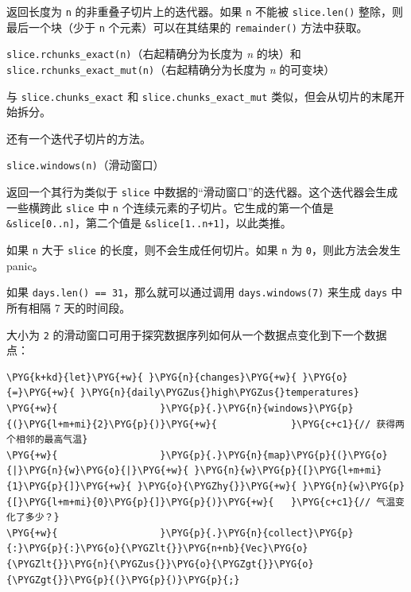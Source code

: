 返回长度为 \texttt{n} 的非重叠子切片上的迭代器。如果 \texttt{n} 不能被 \texttt{slice.len()} 整除，则最后一个块（少于 \texttt{n} 个元素）可以在其结果的 \texttt{remainder()} 方法中获取。

\begin{myNote}
\texttt{slice.rchunks\_exact(n)}（右起精确分为长度为 \emph{n} 的块）和 \texttt{slice.rchunks\_exact\_mut(n)}（右起精确分为长度为 \emph{n} 的可变块）
\end{myNote}

与 \texttt{slice.chunks\_exact} 和 \texttt{slice.chunks\_exact\_mut} 类似，但会从切片的末尾开始拆分。

还有一个迭代子切片的方法。

\begin{mySidenote}
\texttt{slice.windows(n)}（滑动窗口）
\end{mySidenote}

返回一个其行为类似于 \texttt{slice} 中数据的“滑动窗口”的迭代器。这个迭代器会生成一些横跨此 \texttt{slice} 中 \texttt{n} 个连续元素的子切片。它生成的第一个值是 \texttt{\&slice[0..n]}，第二个值是 \texttt{\&slice[1..n+1]}，以此类推。

如果 \texttt{n} 大于 \texttt{slice} 的长度，则不会生成任何切片。如果 \texttt{n} 为 \texttt{0}，则此方法会发生 panic。

如果 \texttt{days.len() == 31}，那么就可以通过调用 \texttt{days.windows(7)} 来生成 \texttt{days} 中所有相隔 7 天的时间段。

大小为 \texttt{2} 的滑动窗口可用于探究数据序列如何从一个数据点变化到下一个数据点：

\begin{Verbatim}[commandchars=\\\{\},breaklines=true,breakanywhere=true,fontsize=\codefont,xleftmargin=17bp]
\PYG{k+kd}{let}\PYG{+w}{ }\PYG{n}{changes}\PYG{+w}{ }\PYG{o}{=}\PYG{+w}{ }\PYG{n}{daily\PYGZus{}high\PYGZus{}temperatures}
\PYG{+w}{                  }\PYG{p}{.}\PYG{n}{windows}\PYG{p}{(}\PYG{l+m+mi}{2}\PYG{p}{)}\PYG{+w}{             }\PYG{c+c1}{// 获得两个相邻的最高气温}
\PYG{+w}{                  }\PYG{p}{.}\PYG{n}{map}\PYG{p}{(}\PYG{o}{|}\PYG{n}{w}\PYG{o}{|}\PYG{+w}{ }\PYG{n}{w}\PYG{p}{[}\PYG{l+m+mi}{1}\PYG{p}{]}\PYG{+w}{ }\PYG{o}{\PYGZhy{}}\PYG{+w}{ }\PYG{n}{w}\PYG{p}{[}\PYG{l+m+mi}{0}\PYG{p}{]}\PYG{p}{)}\PYG{+w}{   }\PYG{c+c1}{// 气温变化了多少？}
\PYG{+w}{                  }\PYG{p}{.}\PYG{n}{collect}\PYG{p}{:}\PYG{p}{:}\PYG{o}{\PYGZlt{}}\PYG{n+nb}{Vec}\PYG{o}{\PYGZlt{}}\PYG{n}{\PYGZus{}}\PYG{o}{\PYGZgt{}}\PYG{o}{\PYGZgt{}}\PYG{p}{(}\PYG{p}{)}\PYG{p}{;}
\end{Verbatim}

